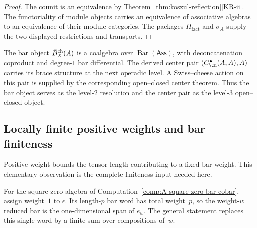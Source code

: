 \begin{proof}
The counit is an equivalence by
Theorem~\ref{thm:koszul-reflection}\ref{KR-ii}.  The functoriality of
module objects carries an equivalence of associative algebras to an
equivalence of their module categories.  The packages
$H_{\mathrm{fact}}$ and $\sigma_A$ supply the two displayed
restrictions and transports.
\end{proof}

\begin{remark}
\label{rem:bar-over-chirAss-shriek}

The bar object $\bar{B}^{\mathrm{ch}}_X(A)$ is a coalgebra over
$\operatorname{Bar}(\mathsf{Ass})$, with deconcatenation coproduct
and degree-$1$ bar differential.  The derived center pair
$(C^\bullet_{\ch}(A,A),A)$ carries its brace structure at the next
operadic level.  A Swiss--cheese action on this pair is supplied by
the corresponding open--closed center theorem.  Thus the bar object
serves as the level-$2$ resolution and the center pair as the
level-$3$ open--closed object.
\end{remark}

\subsection{Locally finite positive weights and bar finiteness}
\label{subsec:archetype-witness-H123}

Positive weight bounds the tensor length contributing to a fixed bar
weight.  This elementary observation is the complete finiteness input
needed here.

For the square-zero algebra of
Computation~\ref{comp:A-square-zero-bar-cobar}, assign weight~$1$ to
$\epsilon$.  Its length-$p$ bar word has total weight~$p$, so the
weight-$w$ reduced bar is the one-dimensional span of $e_w$.  The
general statement replaces this single word by a finite sum over
compositions of~$w$.

